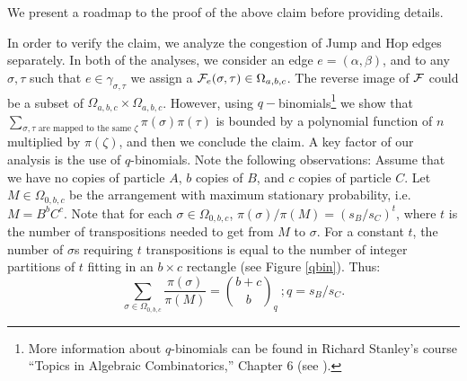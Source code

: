 \documentclass[10 pt]{article}
\begin{document}
We present a roadmap to the proof of the above claim before providing details.
\smallskip

In order to verify the claim, we analyze the congestion of  Jump and Hop edges separately. In both of the analyses, we consider an
edge $e=(\alpha,\beta)$, and to any $\sigma, \tau$ such that $e\in\gamma_{\sigma,\tau}$ we assign a ${\cal F}_e(\sigma,\tau)\in \Omega_{a,b,c}$.
The reverse image of $\cal F$ could be a subset of $\Omega_{a,b,c}\times \Omega_{a,b,c}$. However, using
$q-$binomials\footnote{More information about $q$-binomials can be found in Richard Stanley's course ``Topics in Algebraic Combinatorics,''
Chapter 6 (see \cite{Stanley}). }
we show that $\sum_{\sigma,\tau \text{ are mapped to the same } \zeta} \pi(\sigma)\pi(\tau)$ is bounded by a polynomial function of
$n$ multiplied by $\pi(\zeta)$, and then we conclude the claim. A key factor of our analysis is the use of $q$-binomials.
Note the following observations:
Assume that we have no copies of particle $A$, $b$ copies of $B$, and $c$ copies of particle $C$. Let $M\in \Omega_{0,b,c}$ be the
arrangement with maximum stationary probability, i.e. $M=B^bC^c$. Note that for each $\sigma\in \Omega_{0,b,c}$, $\pi(\sigma)/\pi(M)=(s_{B}/s_C)^t$,
where $t$ is the number of transpositions needed to get from $M$ to $\sigma$. For a constant $t$, the number of $\sigma$s requiring $t$
transpositions is equal to the number of integer partitions of $t$ fitting  in an $b\times c$ rectangle (see Figure \ref{qbin}). Thus:
$$\sum_{\sigma\in \Omega_{0,b,c}} \frac{\pi(\sigma)}{\pi(M)}={{b+c}\choose{b}}_{q}~; q=s_{B}/s_{C}.$$ 
\end{document}
